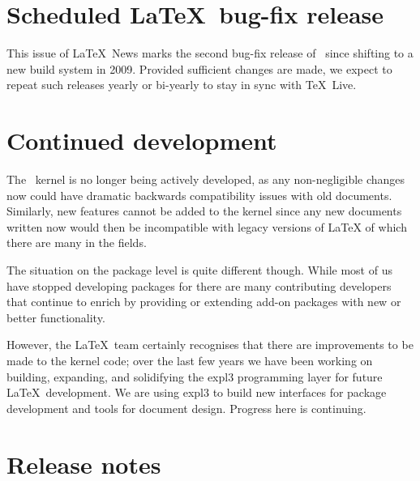 \documentclass{ltnews}
\begin{document}
\maketitle

\section{Scheduled \LaTeX\ bug-fix release}

This issue of \LaTeX~News marks the second bug-fix release of
\LaTeXe\ since shifting to a new build system in 2009.
Provided sufficient changes are made, we expect to
repeat such releases yearly or bi-yearly to stay in sync with \TeX\ Live.

\section{Continued development}

\begin{itshape} %

The \LaTeXe\ kernel is no longer being actively developed, as any non-negligible changes now could have dramatic backwards compatibility issues with old documents. Similarly, new features cannot be added to the kernel since any new documents written now would then be incompatible with legacy versions of \LaTeX{} of which there are many in the fields.

The situation on the package level is quite different though. While most of us have stopped developing packages for \LaTeXe{} there are many contributing developers that continue to enrich \LaTeXe{} by providing or extending add-on packages with new or better functionality.

However, the \LaTeX\ team certainly recognises that there are improvements to be made to the kernel code; over the last few years we have been working on building, expanding, and solidifying the \textsf{expl3} programming layer for future \LaTeX\ development. We are using \textsf{expl3} to build new interfaces for package development and tools for document design. Progress here is continuing.

\end{itshape}



\section{Release notes}
\end{document}
